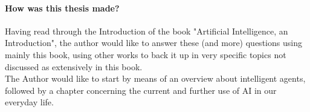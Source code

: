 \paragraph{How was this thesis made?}
Having read through the Introduction of the book "Artificial Intelligence, an Introduction"\cite{russellArtificialIntelligenceModern2010}, the author would like to answer these (and more) questions using mainly this book, using other works to back it up in very specific topics not discussed as extensively in this book.\\The Author would like to start by means of an overview about intelligent agents, followed by a chapter concerning the current and further use of AI in our everyday life.\\